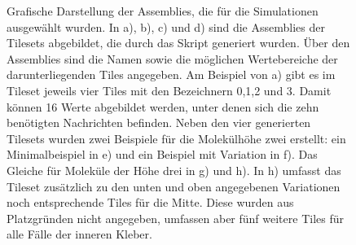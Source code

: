 \begin{figure}
    \caption[Grafische Darstellung der Assemblies für die Evaluation]{Grafische Darstellung der Assemblies, die für die Simulationen ausgewählt wurden. In a), b), c) und d) sind die Assemblies der Tilesets abgebildet, die durch das Skript generiert wurden. Über den Assemblies sind die Namen sowie die möglichen Wertebereiche der darunterliegenden Tiles angegeben. Am Beispiel von a) gibt es im Tileset jeweils vier Tiles mit den Bezeichnern 0,1,2 und 3. Damit können 16 Werte abgebildet werden, unter denen sich die zehn benötigten Nachrichten befinden. Neben den vier generierten Tilesets wurden zwei Beispiele für die Molekülhöhe zwei erstellt: ein Minimalbeispiel in e) und ein Beispiel mit Variation in f). Das Gleiche für Moleküle der Höhe drei in g) und h). In h) umfasst das Tileset zusätzlich zu den unten und oben angegebenen Variationen noch entsprechende Tiles für die Mitte. Diese wurden aus Platzgründen nicht angegeben, umfassen aber fünf weitere Tiles für alle Fälle der inneren Kleber.}
    \label{fig:sim_assemblies}
\end{figure}


